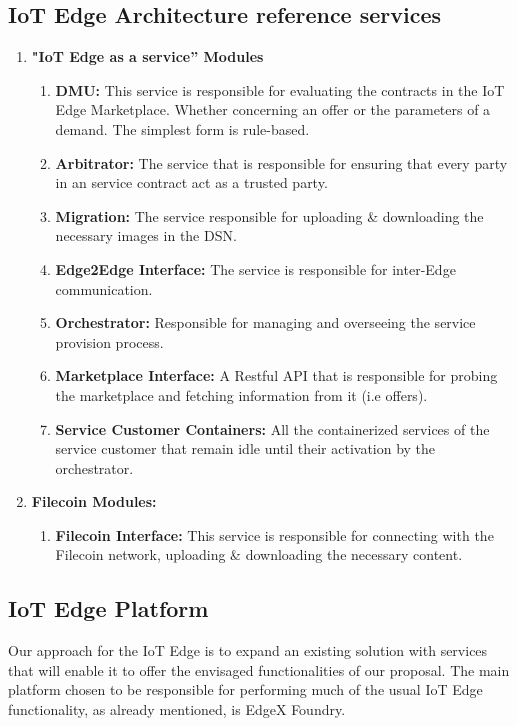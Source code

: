 \subsection{IoT Edge Architecture reference services}
\begin{enumerate}
    \item \textbf{"IoT Edge as a service” Modules}
    \begin{enumerate}[label*=\arabic*.]
        \item \textbf{DMU:} This service is responsible for evaluating the contracts in the IoT Edge Marketplace. Whether concerning an offer or the parameters of a demand. The simplest form is rule-based.
        \item \textbf{Arbitrator:} The service that is responsible for ensuring that every party in an service contract act as a trusted party.
        \item \textbf{Migration:} The service responsible for uploading \& downloading the necessary images in the DSN.
        \item \textbf{Edge2Edge Interface:} The service is responsible for inter-Edge communication.
        \item \textbf{Orchestrator:} Responsible for managing and overseeing the service provision process.
        \item \textbf{Marketplace Interface:} A Restful API that is responsible for probing the marketplace and fetching information from it (i.e offers).
        \item \textbf{Service Customer Containers:} All the containerized services of the service customer that remain idle until their activation by the orchestrator.
        \end{enumerate}
    \item \textbf{Filecoin Modules:}
        \begin{enumerate}[label*=\arabic*.]
        \item \textbf{Filecoin Interface:}  This service is responsible for connecting with the Filecoin network, uploading \& downloading the necessary content.
        \end{enumerate}
\end{enumerate}

\subsection{IoT Edge Platform}

Our approach for the IoT Edge is to expand an existing solution with services that will enable it to offer the envisaged functionalities of our proposal. The main platform chosen to be responsible for performing much of the usual IoT Edge functionality, as already mentioned, is EdgeX Foundry.

